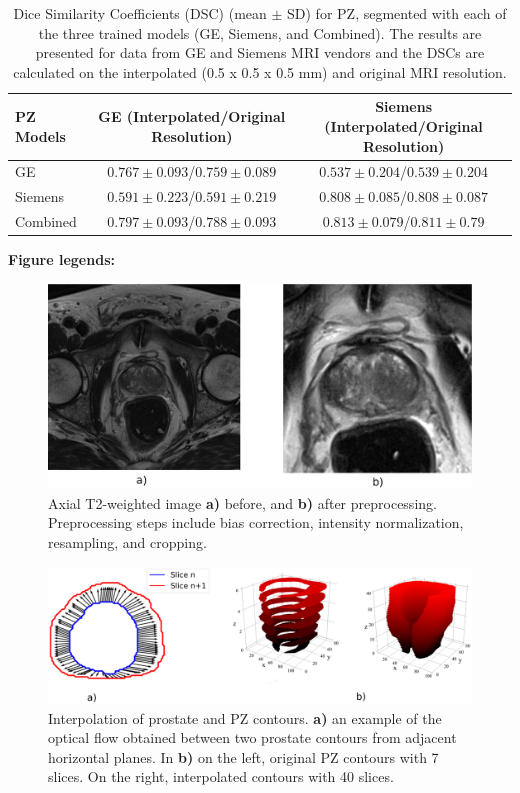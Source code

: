 \newpage
\begin{table}[ht]
     \caption{Dice Similarity Coefficients (DSC) (mean $\pm$ SD) for PZ, segmented with each of the three trained models (GE, Siemens, and Combined). The results are presented for data from GE and Siemens MRI vendors and the DSCs are calculated on the interpolated (0.5 x 0.5 x 0.5 mm) and original MRI resolution.}
    \begin{tabular}{lcc}
         \hline
            \textbf{PZ Models} & \textbf{GE (Interpolated/Original Resolution)} & \textbf{Siemens (Interpolated/Original Resolution)}\\
         \hline
         GE  & $0.767\pm0.093$/$0.759\pm0.089$ & $0.537\pm0.204$/$0.539\pm0.204$ \\
         \hline
         Siemens  & $0.591\pm0.223$/$0.591\pm0.219$ & $0.808\pm0.085$/$0.808\pm0.087$ \\
         \hline
         Combined & $\mathbf{0.797\pm0.093}$/$0.788\pm0.093$ & $\mathbf{0.813\pm0.079}$/$0.811\pm0.79$\\
         \hline
    \end{tabular}
    \label{tab:res_pz}
\end{table}

\newpage
\textbf{Figure legends:}
\begin{figure}[ht]
    \centering
    \includegraphics[totalheight=.25\textheight]{figures/Figure1.eps}
    \caption{Axial T2-weighted image \textbf{a)} before, and \textbf{b)} after preprocessing. Preprocessing steps include bias correction, intensity normalization, resampling, and cropping.} 
    \label{fig_1}
\end{figure}

\begin{figure}[ht]
    \centering
    \includegraphics[totalheight=.21\textheight]{figures/Figure2.eps}
    \caption{Interpolation of prostate and PZ contours. \textbf{a)} an example of the optical flow obtained between two prostate contours from adjacent horizontal planes. In \textbf{b)} on the left, original PZ contours with 7 slices. On the right, interpolated contours with 40 slices.}
    \label{fig:fig_2}
\end{figure}

